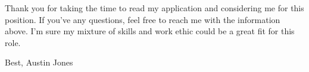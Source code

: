 \documentclass[a4paper,12pt]{article}
\begin{document}
Thank you for taking the time to read my application and considering me for this position.
If you've any questions, feel free to reach me with the information above.
I'm sure my mixture of skills and work ethic could be a great fit for this role.

Best,
Austin Jones
\end{document}

